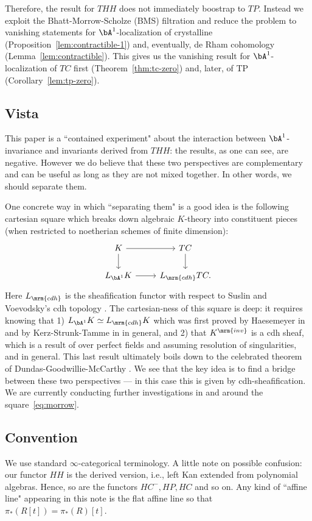 \documentclass[a4paper,10pt]{amsart}
\begin{document}
 Therefore, the result for $THH$ does not immediately boostrap to $TP$. Instead we exploit the Bhatt-Morrow-Scholze (BMS) filtration \cite{BMS2} and reduce the problem to vanishing statements for $\bA^1$-localization of crystalline (Proposition~\ref{lem:contractible-1}) and, eventually, de Rham cohomology (Lemma~\ref{lem:contractible}). This gives us the vanishing result for $\bA^1$-localization of $TC$ first (Theorem~\ref{thm:tc-zero}) and, later, of TP (Corollary~\ref{lem:tp-zero}).

\subsection{Vista} This paper is a ``contained experiment" about the interaction between $\bA^1$-invariance and invariants derived from $THH$: the results, as one can see, are negative. However we do believe that these two perspectives are complementary and can be useful as long as they are not mixed together. In other words, we should separate them.

One concrete way in which ``separating them" is a good idea is the following cartesian square which breaks down algebraic $K$-theory into constituent pieces (when restricted to noetherian schemes of finite dimension):
\begin{equation} \label{eq:morrow}
\begin{tikzcd}
K \ar{r} \ar{d} & TC \ar{d}\\
L_{\bA^1}K \ar{r} & L_{\mrm{cdh}}TC.
\end{tikzcd}
\end{equation}
Here $L_{\mrm{cdh}}$ is the sheafification functor with respect to Suslin and Voevodsky's cdh topology \cite{sv-chow}. The cartesian-ness of this square is deep: it requires knowing that 1) $L_{\bA^1}K \simeq L_{\mrm{cdh}}K$ which was first proved by Haesemeyer in \cite{Haesemeyer} and by Kerz-Strunk-Tamme in \cite[Theorem 6.3]{KST} in general, and 2) that $K^{\mrm{inv}}$ is a cdh sheaf, which is a result of \cite{gh-negative} over perfect fields and assuming resolution of singularities, and \cite{LT} in general. This last result ultimately boils down to the celebrated theorem of Dundas-Goodwillie-McCarthy \cite{dgm}. We see that the key idea is to find a bridge between these two perspectives --- in this case this is given by cdh-sheafification. We are currently conducting further investigations in and around the square~\eqref{eq:morrow}.

\subsection{Convention} We use standard $\infty$-categorical terminology. A little note on possible confusion: our functor $HH$ is the derived version, i.e., left Kan extended from polynomial algebras. Hence, so are the functors $HC^-, HP, HC$ and so on. Any kind of ``affine line" appearing in this note is the flat affine line so that $\pi_*(R[t]) = \pi_*(R)[t]$.
\end{document}
